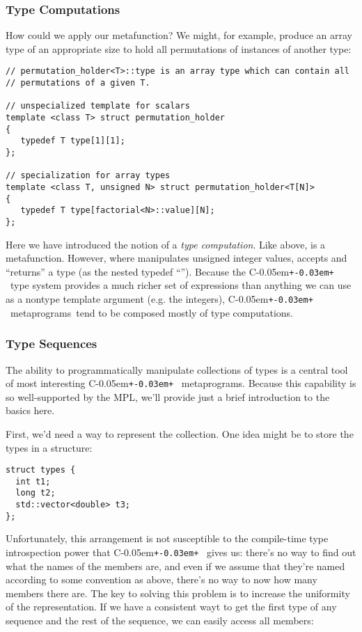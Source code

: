 \documentclass{netobjectdays}
\newcommand{\Cpp}{C\kern-0.05em\texttt{+\kern-0.03em+}%
}
\newcommand{\mpgms}{meta\-programs}
\newcommand{\mfn}{meta\-function}
\begin{document}
\subsubsection{Type Computations}

How could we apply our  \mfn{}? We might, for example,
produce an array type of an appropriate size to hold all permutations
of instances of another type:

{\footnotesize
\begin{verbatim}
// permutation_holder<T>::type is an array type which can contain all
// permutations of a given T.

// unspecialized template for scalars
template <class T> struct permutation_holder
{
   typedef T type[1][1];
};

// specialization for array types
template <class T, unsigned N> struct permutation_holder<T[N]>
{
   typedef T type[factorial<N>::value][N];
};
\end{verbatim}
}

Here we have introduced the notion of a \emph{type computation}.  Like
 above,  is a
\mfn{}. However, where  manipulates unsigned integer
values,  accepts and ``returns'' a
type (as the nested typedef ``''). Because the \Cpp\ type
system provides a much richer set of expressions than anything we can
use as a nontype template argument (e.g. the integers), \Cpp\ \mpgms\
tend to be composed mostly of type computations.

\subsubsection{Type Sequences}

The ability to programmatically manipulate collections of types is a
central tool of most interesting \Cpp\ metaprograms. Because this
capability is so well-supported by the MPL, we'll provide just a brief
introduction to the basics here.

First, we'd need a way to represent the collection. One
idea might be to store the types in a structure:

{\footnotesize
\begin{verbatim}
struct types {
  int t1;
  long t2;
  std::vector<double> t3;
};
\end{verbatim}
}

Unfortunately, this arrangement is not susceptible to the compile-time
type introspection power that \Cpp\ gives us: there's no way to find
out what the names of the members are, and even if we assume that
they're named according to some convention as above, there's no way to
now how many members there are. The key to solving this problem is to
increase the uniformity of the representation. If we have a consistent
wayt to get the first type of any sequence and the rest of the
sequence, we can easily access all members:
\end{document}
